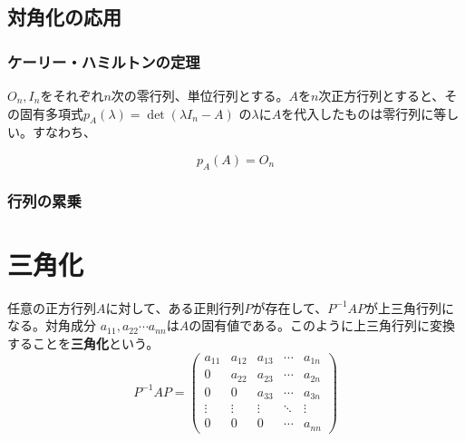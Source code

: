 \documentclass{jlreq}
\begin{document}
\subsection{対角化の応用}

\subsubsection{ケーリー・ハミルトンの定理}
\begin{tcolorbox}[enhanced,title=ケーリー・ハミルトンの定理, 
  attach boxed title to top left, 
  colback=white!95!blue,
  colbacktitle=white!10!blue!50!black,
  drop fuzzy shadow,
  boxrule=0.25mm,
  ]
  $O_n, I_n$をそれぞれ$n$次の零行列、単位行列とする。$A$を$n$次正方行列とすると、その固有多項式$p_A(\lambda) = \det (\lambda I_n - A)$
  の$\lambda$に$A$を代入したものは零行列に等しい。すなわち、

  \begin{equation*}
    p_A(A) = O_n
  \end{equation*}
\end{tcolorbox}

\subsubsection{行列の累乗}

\section{三角化}

\begin{tcolorbox}[enhanced,title=定義1 行列の三角化, 
  attach boxed title to top left, 
  colback=white!95!blue,
  colbacktitle=white!10!blue!50!black,
  drop fuzzy shadow,
  boxrule=0.25mm,
  ]
  任意の正方行列$A$に対して、ある正則行列$P$が存在して、$P^{-1}AP$が上三角行列になる。対角成分
  $a_{11}, a_{22} \cdots a_{nn}$は$A$の固有値である。このように上三角行列に変換することを\textbf{三角化}という。
  \begin{equation}
    P^{-1} A P = 
    \begin{pmatrix}
    a_{11} & a_{12} & a_{13} & \cdots & a_{1n} \\
    0      & a_{22} & a_{23} & \cdots & a_{2n} \\
    0      & 0      & a_{33} & \cdots & a_{3n} \\
    \vdots & \vdots & \vdots & \ddots & \vdots \\
    0      & 0      & 0      & \cdots & a_{nn}
    \end{pmatrix}
    \end{equation}
\end{tcolorbox}
\end{document}
